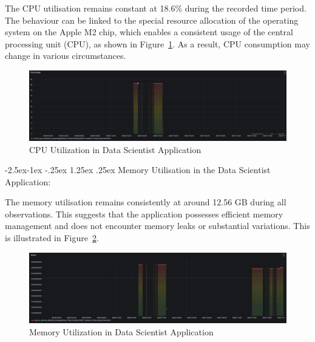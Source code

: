 \documentclass[review]{elsarticle}
\makeatletter
\renewcommand\paragraph{\@startsection{paragraph}{4}{\z@}%
            {-2.5ex\@plus -1ex \@minus -.25ex}%
            {1.25ex \@plus .25ex}%
            {\normalfont\normalsize\itshape}}
\makeatother
\begin{document}
The CPU utilisation remains constant at 18.6\% during the recorded time period. The behaviour can be linked to the special resource allocation of the operating system on the Apple M2 chip, which enables a consistent usage of the central processing unit (CPU), as shown in Figure~\ref{cpuUtilizationInDataScientistApplication}. As a result, CPU consumption may change in various circumstances.

\begin{figure}[h]

  \centering

  \includegraphics[width=\textwidth]{images/CPU-utilization-data-scientist-application.png}

  \caption{CPU Utilization in Data Scientist Application}

  \label{cpuUtilizationInDataScientistApplication}

\end{figure}

\paragraph{Memory Utilisation in the Data Scientist Application:}

The memory utilisation remains consistently at around 12.56 GB during all observations. This suggests that the application possesses efficient memory management and does not encounter memory leaks or substantial variations. This is illustrated in Figure~\ref{memoryUtilizationInDataScientistApplication}.

\begin{figure}[h]

  \centering

  \includegraphics[width=\textwidth]{images/memory-utilization-in-data-scientist-application.png}

  \caption{Memory Utilization in Data Scientist Application}

  \label{memoryUtilizationInDataScientistApplication}

\end{figure}
\end{document}
